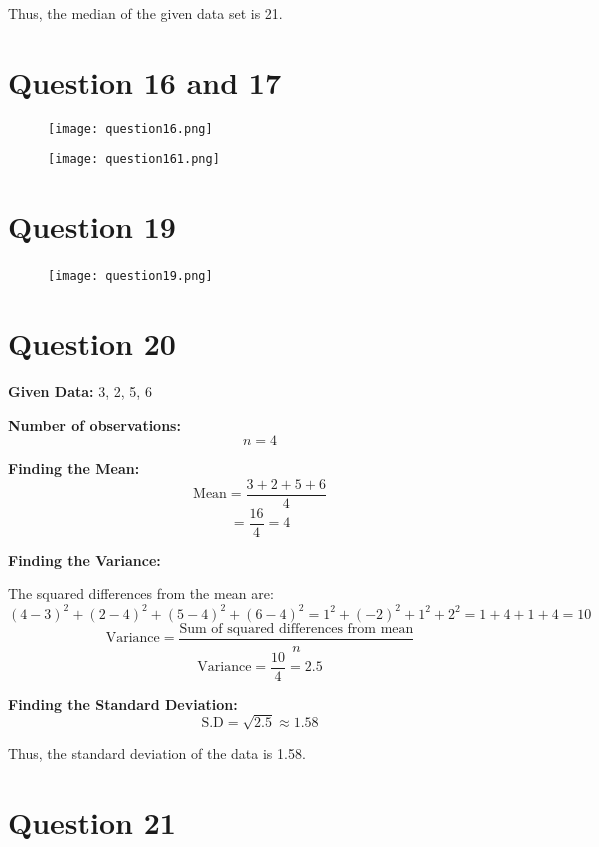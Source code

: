 \documentclass[11pt]{article}
\begin{document}
Thus, the median of the given data set is 21.



\section*{Question 16 and 17}

\begin{figure}[hbt!]
    \centering
    \texttt{[image: question16.png]}
\end{figure}
\clearpage
\begin{figure}[hbt!]
    \centering
    \texttt{[image: question161.png]}
\end{figure}

\clearpage




\section*{Question 19}


\begin{figure}[hbt!]
    \centering
    \texttt{[image: question19.png]}
    \
\end{figure}



\section*{Question 20}

\textbf{Given Data:} 3, 2, 5, 6

\textbf{Number of observations:}
\[
n = 4
\]

\textbf{Finding the Mean:}
\[
\text{Mean} = \frac{3 + 2 + 5 + 6}{4}
\]
\[
= \frac{16}{4} = 4
\]

\textbf{Finding the Variance:}

The squared differences from the mean are:
\[
(4 - 3)^2 + (2 - 4)^2 + (5 - 4)^2 + (6 - 4)^2 = 1^2 + (-2)^2 + 1^2 + 2^2 = 1 + 4 + 1 + 4 = 10
\]
\[
\text{Variance} = \frac{\text{Sum of squared differences from mean}}{n}
\]
\[
\text{Variance} = \frac{10}{4} = 2.5
\]

\textbf{Finding the Standard Deviation:}
\[
\text{S.D} = \sqrt{2.5} \approx 1.58
\]

Thus, the standard deviation of the data is 1.58.





\section*{Question 21}
\end{document}
